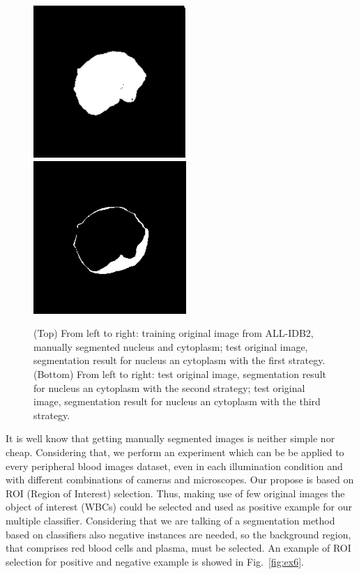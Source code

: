 \documentclass[final,a4paper,12pt,english]{UnicaPhdThesis3}
\begin{document}
\begin{figure}[!b]
	\includegraphics[height=0.10\textheight]{images/2015_1_caip/4-2}
	\includegraphics[height=0.10\textheight]{images/2015_1_caip/4-3}
	\caption{\label{fig:exs} (Top) From left to right: training original image from ALL-IDB2, manually segmented nucleus and cytoplasm; test original image, segmentation result for nucleus an cytoplasm with the first strategy. (Bottom) From left to right: test original image, segmentation result for nucleus an cytoplasm with the second strategy; test original image, segmentation result for nucleus an cytoplasm with the third strategy.}
\end{figure}

It is well know that getting manually segmented images is neither simple nor cheap. Considering that, we perform an experiment which can be be applied to every peripheral blood images dataset, even in each illumination condition and with different combinations  of cameras and microscopes. 
Our propose is based on ROI (Region of Interest) selection. Thus, making use of few original images the object of interest (WBCs) could be selected and used as positive example for our multiple classifier. Considering that we are talking of a segmentation method based on classifiers also negative instances are needed, so the background region, that comprises red blood cells and plasma, must be selected. An example of ROI selection for positive and negative example is showed in Fig.~\ref{fig:ex6}.
\end{document}

